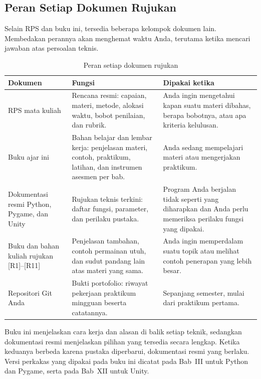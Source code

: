 \subsection{Peran Setiap Dokumen Rujukan}

Selain RPS dan buku ini, tersedia beberapa kelompok dokumen lain. Membedakan
perannya akan menghemat waktu Anda, terutama ketika mencari jawaban atas
persoalan teknis.

\begin{table}[htbp]
\centering
\caption{Peran setiap dokumen rujukan}
\label{tab:peran-dokumen}
{\setlength{\tabcolsep}{4pt}\footnotesize%
\begin{tabularx}{\textwidth}{@{}L{3.6cm} L{4.6cm} Y@{}}
\toprule
\headrow \textbf{Dokumen} & \textbf{Fungsi} & \textbf{Dipakai ketika} \\
\midrule
RPS mata kuliah &
Rencana resmi: capaian, materi, metode, alokasi waktu, bobot penilaian, dan
rubrik. &
Anda ingin mengetahui kapan suatu materi dibahas, berapa bobotnya, atau apa
kriteria kelulusan. \\
\addlinespace
Buku ajar ini &
Bahan belajar dan lembar kerja: penjelasan materi, contoh, praktikum, latihan,
dan instrumen asesmen per bab. &
Anda sedang mempelajari materi atau mengerjakan praktikum. \\
\addlinespace
Dokumentasi resmi Python, Pygame, dan Unity \cite{pygame-docs,unity-learn} &
Rujukan teknis terkini: daftar fungsi, parameter, dan perilaku pustaka. &
Program Anda berjalan tidak seperti yang diharapkan dan Anda perlu memeriksa
perilaku fungsi yang dipakai. \\
\addlinespace
Buku dan bahan kuliah rujukan \mbox{[R1]}--\mbox{[R11]} &
Penjelasan tambahan, contoh permainan utuh, dan sudut pandang lain atas materi
yang sama. &
Anda ingin memperdalam suatu topik atau melihat contoh penerapan yang lebih
besar. \\
\addlinespace
Repositori Git Anda &
Bukti portofolio: riwayat pekerjaan praktikum mingguan beserta catatannya. &
Sepanjang semester, mulai dari praktikum pertama. \\
\bottomrule
\end{tabularx}}
\end{table}

\begin{catatabox}
Buku ini menjelaskan cara kerja dan alasan di balik setiap teknik, sedangkan
dokumentasi resmi menjelaskan pilihan yang tersedia secara lengkap. Ketika
keduanya berbeda karena pustaka diperbarui, dokumentasi resmi yang berlaku.
Versi perkakas yang dipakai pada buku ini dicatat pada Bab~III untuk Python
dan Pygame, serta pada Bab~XII untuk Unity.
\end{catatabox}
